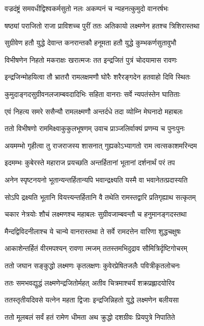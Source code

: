 \twolineshloka
{वज्रदंष्ट्रं समवधीद्विश्वकर्मसुतो नलः}
{अकम्पनं च न्यहनत्कुमुदो वानरर्षभः}%

\twolineshloka
{षष्ठ्यां पराजितो राजा प्राविशच्च पुरीं ततः}
{अतिकायो लक्ष्मणेन हतश्च त्रिशिरास्तथा}%

\twolineshloka
{सुग्रीवेण हतौ युद्धे देवान्त कनरान्तकौ}
{हनूमता हतौ युद्धे कुम्भकर्णसुतावुभौ}%

\twolineshloka
{विभीषणेन निहतो मकराक्षः खरात्मजः}
{तत इन्द्रजितं पुत्रं चोदयामास रावणः}%

\twolineshloka
{इन्द्रजिन्मोहयित्वा तौ भ्रातरौ रामलक्षमणौ}
{घोरैः शरैरङ्गदेन हतवाहो दिवि स्थितः}%

\twolineshloka
{कुमुदाङ्गदसुग्रीवनलजाम्बवदादिभिः}
{सहिता वानराः सर्वे न्यपतंस्तेन घातिताः}%

\twolineshloka
{एवं निहत्य समरे ससैन्यौ रामलक्ष्मणौ}
{अन्तर्दधे तदा व्योम्नि मेघनादो महाबलः}%

\twolineshloka
{ततो विभीषणो राममिक्ष्वाकुकुलभूषणम्}
{उवाच प्राञ्जलिर्वाक्यं प्रणम्य च पुनःपुनः}%

\twolineshloka
{अयमम्भो गृहीत्वा तु राजराजस्य शासनात्}
{गुह्यकोऽभ्यागतो राम त्वत्सकाशमरिन्दम}%

\twolineshloka
{इदमम्भः कुबेरस्ते महाराज प्रयच्छति}
{अन्तर्हितानां भूतानां दर्शनार्थं परं तप}%

\twolineshloka
{अनेन स्पृष्टनयनो भूतान्यन्तर्हितान्यपि}
{भवान्द्रक्ष्यति यस्मै वा भवानेतत्प्रदास्यति}%

\twolineshloka
{सोऽपि द्रक्ष्यति भूतानि वियत्त्यन्तर्हितानि वै}
{तथेति रामस्तद्वारि प्रतिगृह्याथ सत्कृतम्}%

\twolineshloka
{चकार नेत्रयोः शौचं लक्ष्मणश्च महाबलः}
{सुग्रीवजाम्बवन्तौ च हनुमानङ्गदस्तथा}%

\twolineshloka
{मैन्दद्विविदनीलाश्च ये चान्ये वानरास्तथा}
{ते सर्वे रामदत्तेन वारिणा शुद्धचक्षुषः}%

\twolineshloka
{आकाशेन्तर्हितं वीरमपश्यन् रावणा त्मजम्}
{ततस्तमभिदुद्राव सौमित्रिर्दृष्टिगोचरम्}%

\twolineshloka
{ततो जघान सङ्कुद्धो लक्ष्मणः कृतलक्षणः}
{कुवेरप्रेषितजलैः पवित्रीकृतलोचनः}%

\twolineshloka
{ततः समभवद्युद्धं लक्ष्मणेन्द्रजितोर्महत्}
{अतीव चित्रमाश्चर्यं शक्रप्रह्लादयोरिव}%

\twolineshloka
{ततस्तृतीयदिवसे यत्नेन महता द्विजाः}
{इन्द्रजिन्निहतो युद्धे लक्ष्मणेन बलीयसा}%

\twolineshloka
{ततो मूलबलं सर्वं हतं रामेण धीमता}
{अथ क्रुद्धो दशग्रीवः प्रियपुत्रे निपातिते}%

